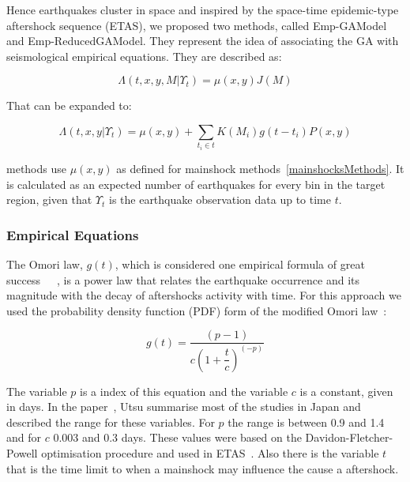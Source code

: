 Hence earthquakes cluster in space and inspired by the space-time epidemic-type aftershock sequence (ETAS), we proposed two methods, called Emp-GAModel and Emp-ReducedGAModel. They represent the idea of associating the GA with seismological empirical equations. They are described as:

\begin{equation}\label{reducedgamodel}
	\Lambda(t,x,y,M|\Upsilon_t) = \mu(x,y)J(M)
\end{equation}

That can be expanded to:

\begin{equation}\label{emp-model}
 \Lambda(t,x,y|\Upsilon_t) = \mu(x,y) + \displaystyle\sum_{t_i \in t} K(M_i)g(t-t_i)P(x,y)
\end{equation}

 methods use $\mu(x,y)$ as defined for mainshock methods~\ref{mainshocksMethods}. It is calculated as an expected number of earthquakes for every bin in the target region, given that $\Upsilon_t$ is the earthquake observation data up to time $t$.

\subsubsection{Empirical Equations}

The Omori law, $g(t)$, which is considered one empirical formula of great success~\cite{zhuang2004analyzing}~\cite{utsu1995centenary}~\cite{omori1895after}, is a power law that relates the earthquake occurrence and its magnitude with the decay of aftershocks activity with time. For this approach we used the probability density function (PDF) form of the modified Omori law~\cite{zhuang2004analyzing}:

\begin{equation}\label{omori}
	g(t)= \dfrac{(p-1)}{c(1+ \dfrac{t}{c})^(-p)}
\end{equation}

The variable $p$ is a index of this equation and the variable $c$ is a constant, given in days. In the paper~\cite{utsu1995centenary}, Utsu summarise most of the studies in Japan and described the range for these variables. For $p$ the range is between 0.9 and 1.4 and for $c$ 0.003 and 0.3 days. These values were based on the Davidon-Fletcher-Powell optimisation procedure and used in ETAS~\cite{utsu1995centenary}. Also there is the variable $t$ that is the time limit to when a mainshock may influence the cause a aftershock.

